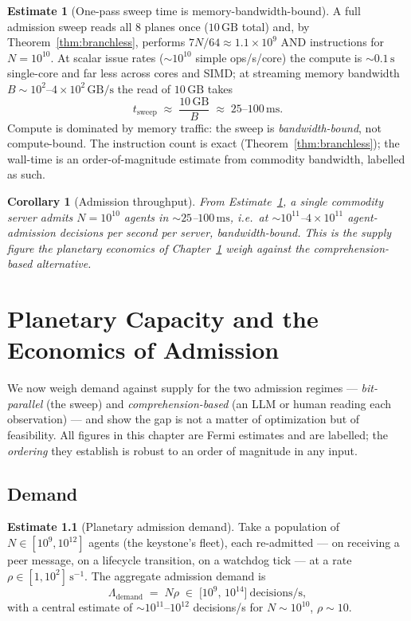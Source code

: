 \documentclass[11pt,oneside]{book}
\theoremstyle{definition}
\newtheorem{estimate}{Estimate}[chapter]
\theoremstyle{plain}
\newtheorem{corollary}[theorem]{Corollary}
\theoremstyle{remark}
\newcommand{\Bw}{B}                            %
\begin{document}
\begin{estimate}[One-pass sweep time is memory-bandwidth-bound]\label{est:sweep}
A full admission sweep reads all $8$ planes once ($10\,\mathrm{GB}$ total) and, by
Theorem~\ref{thm:branchless}, performs $7N/64\approx 1.1\times 10^{9}$ AND instructions for
$N=10^{10}$. At scalar issue rates ($\sim\!10^{10}$ simple ops/s/core) the compute is
$\sim\!0.1\,\mathrm{s}$ single-core and far less across cores and SIMD; at streaming memory
bandwidth $\Bw\sim 10^{2}$--$4\times 10^{2}\,\mathrm{GB/s}$ the read of $10\,\mathrm{GB}$ takes
\[
t_{\text{sweep}}\;\approx\;\frac{10\,\mathrm{GB}}{\Bw}\;\approx\;25\text{--}100\,\mathrm{ms}.
\]
Compute is dominated by memory traffic: the sweep is \emph{bandwidth-bound}, not compute-bound.
The instruction count is exact (Theorem~\ref{thm:branchless}); the wall-time is an
order-of-magnitude estimate from commodity bandwidth, labelled as such.
\end{estimate}

\begin{corollary}[Admission throughput]\label{cor:throughput}
From Estimate~\ref{est:sweep}, a single commodity server admits $N=10^{10}$ agents in
$\sim\!25$--$100\,\mathrm{ms}$, i.e.\ at $\sim\!10^{11}$--$4\times 10^{11}$ agent-admission
decisions per second per server, bandwidth-bound. This is the supply figure the planetary
economics of Chapter~\ref{ch:econ} weigh against the comprehension-based alternative.
\end{corollary}

\chapter{Planetary Capacity and the Economics of Admission}
\label{ch:econ}

We now weigh demand against supply for the two admission regimes --- \emph{bit-parallel} (the
sweep) and \emph{comprehension-based} (an LLM or human reading each observation) --- and show the
gap is not a matter of optimization but of feasibility. All figures in this chapter are Fermi
estimates and are labelled; the \emph{ordering} they establish is robust to an order of magnitude
in any input.

\section{Demand}

\begin{estimate}[Planetary admission demand]\label{est:demand}
Take a population of $N\in[10^{9},10^{12}]$ agents (the keystone's fleet), each re-admitted --- on
receiving a peer message, on a lifecycle transition, on a watchdog tick --- at a rate
$\rho\in[1,10^{2}]\,\mathrm{s^{-1}}$. The aggregate admission demand is
\[
\Lambda_{\text{demand}}\;=\;N\rho\;\in\;\bigl[10^{9},\,10^{14}\bigr]\ \text{decisions/s},
\]
with a central estimate of $\sim\!10^{11}$--$10^{12}$ decisions/s for $N\sim 10^{10}$,
$\rho\sim 10$.
\end{estimate}
\end{document}
